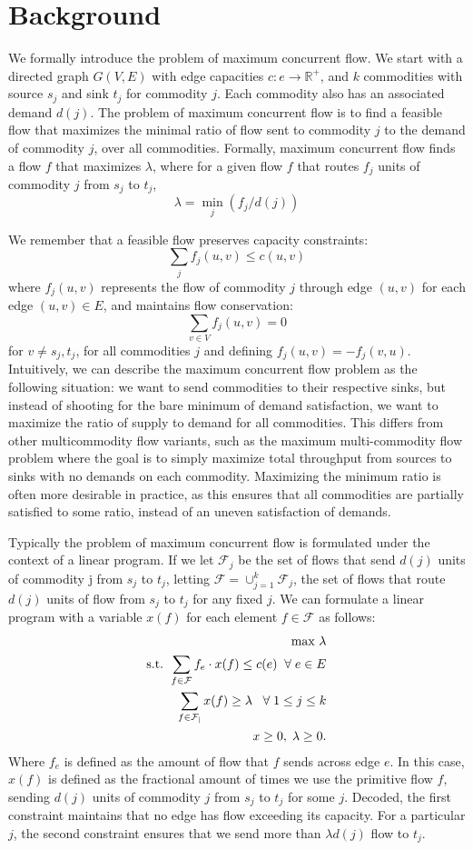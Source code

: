 \section{Background}
We formally introduce the problem of maximum concurrent flow. We
start with a directed graph $G(V,E)$ with edge capacities 
$c: e \rightarrow \mathbb{R}^+$,
 and $k$ commodities with source $s_j$ and sink $t_j$ for
commodity $j$. Each commodity also has an associated demand
$d(j)$. The problem of maximum concurrent flow is to find a feasible
flow that maximizes the minimal ratio of flow sent to commodity $j$ to the
demand of commodity $j$, over all commodities. Formally, maximum
concurrent flow finds a flow $f$ that maximizes $\lambda$, where for a given flow $f$ that routes $f_j$
units of commodity $j$ from $s_j$ to $t_j$, 
$$\lambda = \min_{j}(f_j/d(j))$$

We remember that a feasible flow preserves capacity constraints: 
$$\sum_j f_j(u,v) \leq c(u,v)$$
where $f_j(u,v)$ represents the flow of commodity $j$ through edge
$(u,v)$ for each edge $(u,v)\in E$, and maintains flow conservation:
$$\sum_{v\in V} f_j(u,v)=0$$ 
for $v\neq s_j,t_j$, for all commodities $j$ and defining
$f_j(u,v)=-f_j(v,u)$. Intuitively, we can describe the maximum
concurrent flow problem as the following situation: we want to send
commodities to their respective sinks, but instead of shooting for the
bare minimum of demand satisfaction, we want to maximize the ratio of
supply to demand for all commodities. This differs from other
multicommodity flow variants, such as the maximum multi-commodity flow
problem where the goal is to simply maximize total throughput from
sources to sinks with no demands on each commodity. Maximizing the minimum ratio is often more desirable in practice,
as this ensures that all commodities are partially satisfied to some ratio, instead of an uneven satisfaction of demands.

Typically the problem of maximum concurrent flow is formulated under the context of a linear
program. If we let $\mathcal{F}_j$ be the set of flows that send $d(j)$ units
of commodity j from $s_j$ to $t_j$, letting
 $\mathcal{F}=\cup_{j=1}^k \mathcal{F}_j$, the set of flows that route
$d(j)$ units of flow from $s_j$ to $t_j$ for any fixed $j$. We can
formulate a linear program with a variable $x(f)$ for each element
$f\in \mathcal{F}$ as follows:
\begin{align*}
\text{max     } \lambda \\
\text{s.t. }\sum_{f\in \mathcal{F}}f_e\cdot x(f) \leq c(e) \;\;\forall\;
e\in E \\
\sum_{f\in \cal{F}_j} x(f)\geq \lambda \;\;\;\forall\; 1\leq j\leq k \\
x\geq 0,\; \lambda\geq 0.
\end{align*}
Where $f_e$ is defined as the amount of flow that $f$ sends across edge $e$. In this case, $x(f)$ is defined as the fractional amount of times we use the
primitive flow $f$, sending $d(j)$ units of commodity $j$ from $s_j$
to $t_j$ for some $j$. Decoded, the first constraint maintains that no
edge has flow exceeding its capacity. For a particular $j$, the second
constraint ensures that we send more than $\lambda d(j)$ flow to
$t_j$. 

